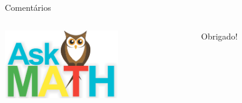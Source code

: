 \documentclass[10pt]{beamer}
\begin{document}
\begin{frame}{Coment\'arios}
	\begin{columns}
		\begin{column}{3cm}
			\includegraphics[height=3cm]{figuras/askmath.png}
		\end{column}
		\begin{column}{7cm}
			\begin{flushright}
				\centering
				\vskip 0.5cm
				\Huge Obrigado!
			\end{flushright}
		\end{column}
	\end{columns}
\end{frame}
\end{document}
